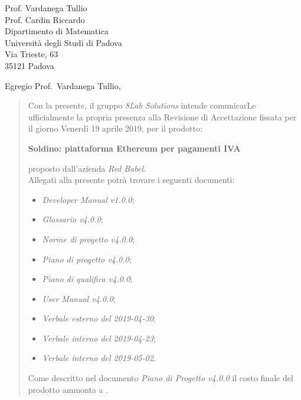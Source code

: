 
\begin{letter}{
		Prof. Vardanega Tullio \\
		Prof. Cardin Riccardo \\
		Dipartimento di Matematica \\
		Università degli Studi di Padova \\
		Via Trieste, 63 \\
		35121 Padova}
		
\opening{Egregio Prof.~Vardanega Tullio,}

\begin{quotation}
Con la presente, il gruppo \textit{8Lab Solutions} intende 
comunicarLe ufficialmente la propria presenza alla Revisione di 
Accettazione fissata per il giorno Venerdì 19 aprile 2019, per il prodotto:

\begin{center}
	\textbf{Soldino: piattaforma Ethereum per pagamenti IVA}
\end{center}

\noindent proposto dall'azienda \textit{Red Babel}. \\
Allegati alla presente potrà trovare i seguenti documenti:

\begin{itemize}
	
	\item \textit{Developer Manual v1.0.0};
	
	\item \textit{Glossario v4.0.0};
	
	\item \textit{Norme di progetto v4.0.0};

	\item \textit{Piano di progetto v4.0.0};

	\item \textit{Piano di qualifica v4.0.0};
	
	\item \textit{User Manual v4.0.0};
	
	
	\item \textit{Verbale esterno del 2019-04-30};
	\item \textit{Verbale interno del 2019-04-23};
	\item \textit{Verbale interno del 2019-05-02}.
\end{itemize}
	


\noindent Come descritto nel documento \textit{Piano di Progetto v4.0.0} il 
costo finale del prodotto ammonta a \textbf{}.\\


\end{quotation}
\end{letter}
